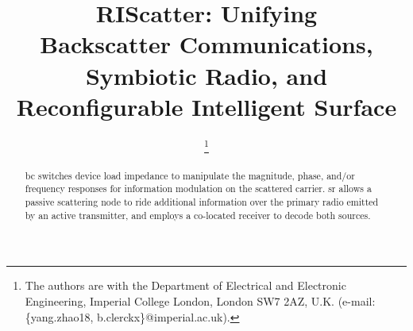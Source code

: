 \documentclass[journal]{IEEEtran}
\begin{document}
\title{RIScatter: Unifying\\Backscatter Communications, Symbiotic Radio, and Reconfigurable Intelligent Surface}
\author{
	\thanks{
		The authors are with the Department of Electrical and Electronic Engineering, Imperial College London, London SW7 2AZ, U.K. (e-mail: \{yang.zhao18, b.clerckx\}@imperial.ac.uk).
	}
}
\maketitle

\begin{abstract}
	\gls{bc} switches device load impedance to manipulate the magnitude, phase, and/or frequency responses for information modulation on the scattered carrier.
	\gls{sr} allows a passive scattering node to ride additional information over the primary radio emitted by an active transmitter, and employs a co-located receiver to decode both sources.

\end{abstract}
\end{document}
